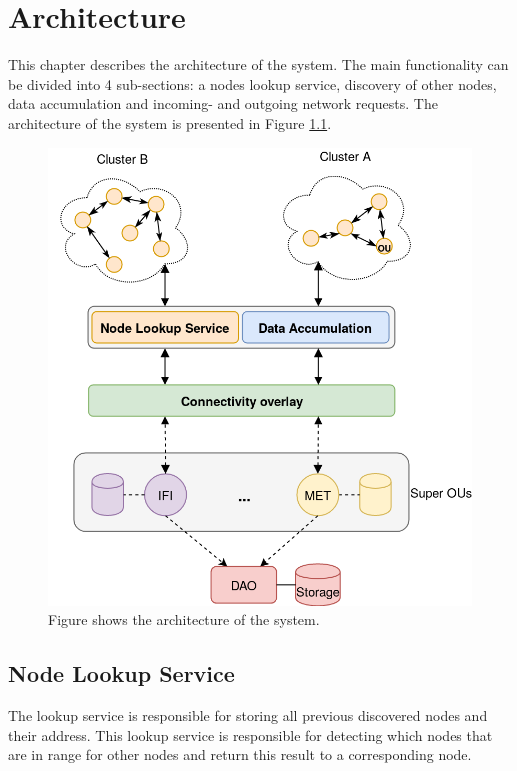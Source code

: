 \documentclass[USenglish]{uit-thesis}
\begin{document}
\chapter{Architecture}

This chapter describes the architecture of the system. The main functionality can be divided into 4 sub-sections: a nodes lookup service, discovery of other nodes, data accumulation and incoming- and outgoing network requests. The architecture of the system is presented in Figure \ref{fig:architecture3}.


\begin{figure}
\centering
\includegraphics[width=\textwidth]{arch3.png}
\caption{Figure shows the architecture of the system.}
\label{fig:architecture3}
\end{figure}

\section{Node Lookup Service} \label{sec:nodeLS}
The lookup service is responsible for storing all previous discovered nodes and their address. This lookup service is responsible for detecting which nodes that are in range for other nodes and return this result to a corresponding node. 
\end{document}

